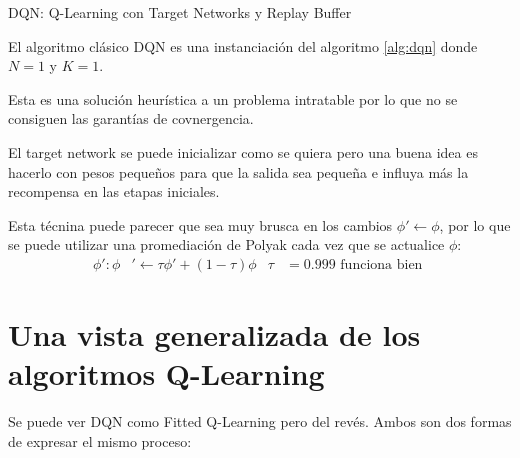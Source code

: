 \begin{algorithm}
    \caption{DQN: Q-Learning con Target Networks y Replay Buffer}
    \label{alg:dqn}
\end{algorithm}

El algoritmo clásico DQN es una instanciación del algoritmo \ref{alg:dqn} donde $N=1$ y
$K=1$.

Esta es una solución heurística a un problema intratable por lo que no se consiguen las
garantías de covnergencia.

El target network se puede inicializar como se quiera pero una buena idea es hacerlo con pesos
pequeños para que la salida sea pequeña e influya más la recompensa en las etapas iniciales.

Esta técnina puede parecer que sea muy brusca en los cambios $\phi'\gets\phi$,
por lo que se puede utilizar una promediación de Polyak cada vez que se actualice $\phi$:
\begin{align}
    \phi':\phi&'\gets\tau\phi'+(1-\tau)\phi & \tau&=0.999 \textrm{ funciona bien }
\end{align}


\section{Una vista generalizada de los algoritmos Q-Learning}%
\label{sec:una_vista_generalizada_de_los_algoritmos_q_learning}

Se puede ver DQN como Fitted Q-Learning pero del revés. Ambos son dos formas de expresar el mismo
proceso:

